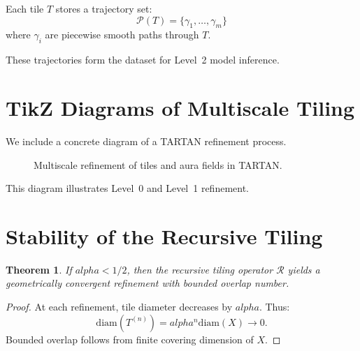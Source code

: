 \documentclass[12pt,oneside]{book}
\theoremstyle{plain}
\newtheorem{theorem}{Theorem}[chapter]
\theoremstyle{definition}
\def\alpha{alpha}%
\begin{document}
Each tile $T$ stores a trajectory set:
\[
\mathcal{P}(T) = \{\gamma_1, \dots, \gamma_m\}
\]
where $\gamma_i$ are piecewise smooth paths through $T$.

These trajectories form the dataset for Level~2 model inference.

\section{TikZ Diagrams of Multiscale Tiling}

We include a concrete diagram of a TARTAN refinement process.

\begin{figure}[h]
\centering
{}
\caption{Multiscale refinement of tiles and aura fields in TARTAN.}
\end{figure}

This diagram illustrates Level~0 and Level~1 refinement.

\section{Stability of the Recursive Tiling}

\begin{theorem}
If $\alpha < 1/2$, then the recursive tiling operator $\mathcal{R}$ yields a
geometrically convergent refinement with bounded overlap number.
\end{theorem}

\begin{proof}
At each refinement, tile diameter decreases by $\alpha$.
Thus:
\[
\text{diam}(T^{(n)}) = \alpha^n \text{diam}(X) \to 0.
\]
Bounded overlap follows from finite covering dimension of $X$.
\end{proof}
\end{document}

